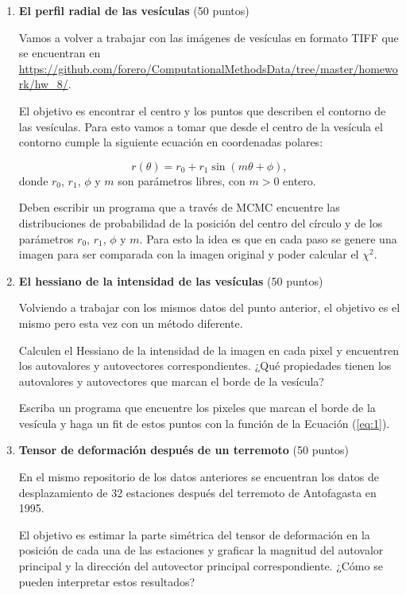 \documentclass{article}
\begin{document}
\begin{enumerate}

\item {\bf El perfil radial de las ves\'iculas} (50 puntos)

Vamos a volver a trabajar con las im\'agenes de ves\'iculas en formato
TIFF que se encuentran en
\url{https://github.com/forero/ComputationalMethodsData/tree/master/homework/hw_8/}.

El objetivo es encontrar el centro y los puntos que describen el
contorno de las ves\'iculas. Para esto vamos a tomar que desde el
centro de la ves\'icula el contorno cumple la siguiente ecuaci\'on en
coordenadas polares:

\begin{equation}
r(\theta) = r_{0} + r_{1}\sin(m\theta + \phi), 
\label{eq:1}
\end{equation}
donde $r_0$, $r_1$, $\phi$ y $m$ son par\'ametros libres, con $m>0$ entero.

Deben escribir un programa que a trav\'es de MCMC encuentre las
distribuciones de probabilidad de la posici\'on del centro del
c\'irculo y de los par\'ametros $r_0$, $r_1$, $\phi$ y $m$. 
Para esto la idea es que en cada paso se genere una imagen para ser
comparada con la imagen original y poder calcular el $\chi^2$. 


\item {\bf El hessiano de la intensidad de las ves\'iculas} (50
  puntos)

Volviendo a trabajar con los mismos datos del punto anterior, el
objetivo es el mismo pero esta vez con un m\'etodo diferente.

Calculen el Hessiano de la intensidad de la imagen en cada pixel y
encuentren los autovalores y autovectores correspondientes. ¿Qué
propiedades tienen los autovalores y autovectores que marcan el borde
de la ves\'icula?

Escriba un programa que encuentre los pixeles que marcan el borde de
la ves\'icula y haga un fit de estos puntos con la funci\'on de la
Ecuaci\'on (\ref{eq:1}).

\item {\bf Tensor de deformaci\'on despu\'es de un terremoto} (50 puntos)

En el mismo repositorio de los datos anteriores se encuentran los
datos de desplazamiento de 32 estaciones despu\'es del terremoto de
Antofagasta en 1995.

El objetivo es estimar la parte simétrica del tensor de deformaci\'on
en la posición de cada una de las estaciones y graficar la magnitud
del autovalor principal y la dirección del autovector principal
correspondiente. ¿Cómo se pueden interpretar estos resultados? 

\end{enumerate}
\end{document}
